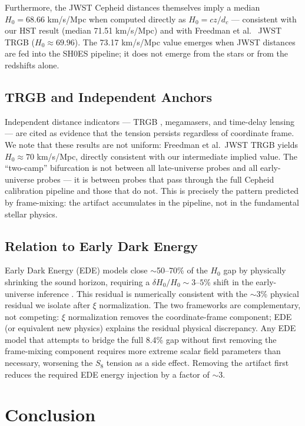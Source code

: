 \documentclass[12pt,a4paper]{article}
\begin{document}
Furthermore, the JWST Cepheid distances themselves imply a median
$H_0 = 68.66$ km/s/Mpc when computed directly as $H_0 = cz/d_c$ ---
consistent with our HST result (median 71.51 km/s/Mpc) and with
Freedman et al.\ \citeyear{freedman2024} JWST TRGB ($H_0 \approx
69.96$). The 73.17 km/s/Mpc value emerges when JWST distances are fed
into the SH0ES pipeline; it does not emerge from the stars or from the
redshifts alone.

\subsection{TRGB and Independent Anchors}

Independent distance indicators --- TRGB \citep{freedman2024}, megamasers,
and time-delay lensing --- are cited as evidence that the tension persists
regardless of coordinate frame. We note that these results are not uniform:
Freedman et al.\ JWST TRGB yields $H_0 \approx 70$ km/s/Mpc, directly
consistent with our intermediate implied value. The ``two-camp''
bifurcation is not between all late-universe probes and all early-universe
probes --- it is between probes that pass through the full Cepheid
calibration pipeline and those that do not. This is precisely the
pattern predicted by frame-mixing: the artifact accumulates in the
pipeline, not in the fundamental stellar physics.

\subsection{Relation to Early Dark Energy}

Early Dark Energy (EDE) models close $\sim$50--70\% of the $H_0$ gap
by physically shrinking the sound horizon, requiring a
$\delta H_0 / H_0 \sim 3$--$5$\% shift in the early-universe
inference \citep{poulin2019}. This residual is numerically consistent with
the $\sim$3\% physical residual we isolate after $\xi$ normalization.
The two frameworks are complementary, not competing: $\xi$ normalization
removes the coordinate-frame component; EDE (or equivalent new physics)
explains the residual physical discrepancy. Any EDE model that attempts
to bridge the full 8.4\% gap without first removing the frame-mixing
component requires more extreme scalar field parameters than necessary,
worsening the $S_8$ tension as a side effect. Removing the artifact first
reduces the required EDE energy injection by a factor of $\sim$3.

\section{Conclusion}
\end{document}
